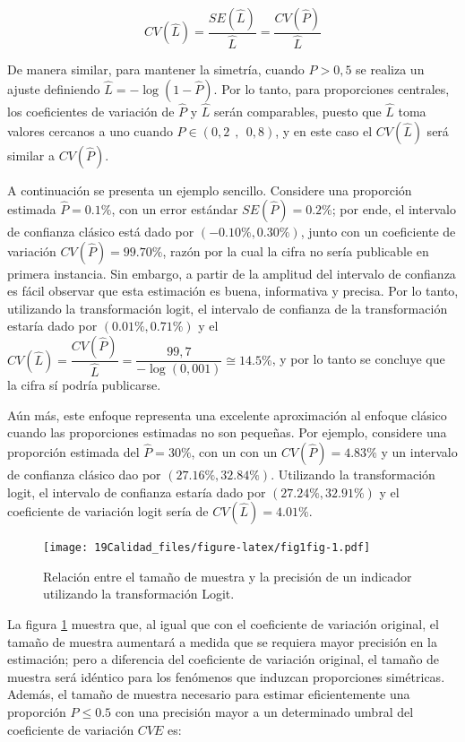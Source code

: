 \documentclass[
  12pt,
]{book}
\begin{document}
\[
CV(\hat{L}) = \dfrac{SE(\hat{L})}{\hat{L}} = \dfrac{CV(\hat{P})}{\hat{L}}
\]

De manera similar, para mantener la simetría, cuando \(P>0,5\) se realiza un ajuste definiendo \(\hat{L} = -\log(1-\hat{P})\). Por lo tanto, para proporciones centrales, los coeficientes de variación de \(\hat{P}\) y \(\hat{L}\) serán comparables, puesto que \(\hat{L}\) toma valores cercanos a uno cuando \(P \in (0,2\ \ ,\ \ 0,8)\), y en este caso el \(CV(\hat{L})\) será similar a \(CV(\hat{P})\).

A continuación se presenta un ejemplo sencillo. Considere una proporción estimada \(\hat{P} = 0.1\%\), con un error estándar \(SE(\hat{P}) = 0.2\%\); por ende, el intervalo de confianza clásico está dado por \((-0.10\%, 0.30\%)\), junto con un coeficiente de variación \(CV(\hat{P}) = 99.70\%\), razón por la cual la cifra no sería publicable en primera instancia. Sin embargo, a partir de la amplitud del intervalo de confianza es fácil observar que esta estimación es buena, informativa y precisa. Por lo tanto, utilizando la transformación logit, el intervalo de confianza de la transformación estaría dado por \((0.01\%, 0.71\%)\) y el \(CV(\hat{L})= \dfrac{CV(\hat{P})}{\hat{L}}=\dfrac{99,7}{-\log(0,001)}\cong 14.5\%\), y por lo tanto se concluye que la cifra sí podría publicarse.

Aún más, este enfoque representa una excelente aproximación al enfoque clásico cuando las proporciones estimadas no son pequeñas. Por ejemplo, considere una proporción estimada del \(\hat{P} = 30\%\), con un con un \(CV(\hat{P}) = 4.83\%\) y un intervalo de confianza clásico dao por \((27.16\%, 32.84\%)\). Utilizando la transformación logit, el intervalo de confianza estaría dado por \((27.24\%, 32.91\%)\) y el coeficiente de variación logit sería de \(CV(\hat{L}) = 4.01\%\).

\begin{figure}
\centering
\texttt{[image: 19Calidad\_files/figure-latex/fig1fig-1.pdf]}
\caption{\label{fig:fig1fig}Relación entre el tamaño de muestra y la precisión de un indicador utilizando la transformación Logit.}
\end{figure}

La figura \ref{fig:fig1fig} muestra que, al igual que con el coeficiente de variación original, el tamaño de muestra aumentará a medida que se requiera mayor precisión en la estimación; pero a diferencia del coeficiente de variación original, el tamaño de muestra será idéntico para los fenómenos que induzcan proporciones simétricas. Además, el tamaño de muestra necesario para estimar eficientemente una proporción \(P\leq 0.5\) con una precisión mayor a un determinado umbral del coeficiente de variación \(CVE\) es:
\end{document}
